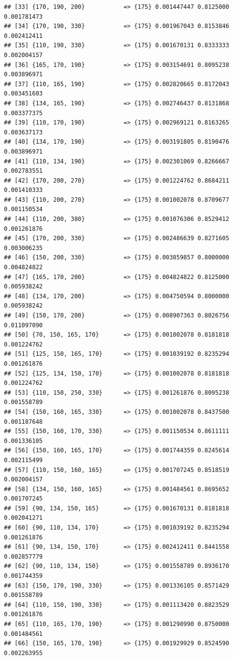 \documentclass[
]{article}
\begin{document}
\begin{verbatim}
## [33] {170, 190, 200}           => {175} 0.001447447 0.8125000  0.001781473
## [34] {170, 190, 330}           => {175} 0.001967043 0.8153846  0.002412411
## [35] {110, 190, 330}           => {175} 0.001670131 0.8333333  0.002004157
## [36] {165, 170, 190}           => {175} 0.003154691 0.8095238  0.003896971
## [37] {110, 165, 190}           => {175} 0.002820665 0.8172043  0.003451603
## [38] {134, 165, 190}           => {175} 0.002746437 0.8131868  0.003377375
## [39] {110, 170, 190}           => {175} 0.002969121 0.8163265  0.003637173
## [40] {134, 170, 190}           => {175} 0.003191805 0.8190476  0.003896971
## [41] {110, 134, 190}           => {175} 0.002301069 0.8266667  0.002783551
## [42] {170, 200, 270}           => {175} 0.001224762 0.8684211  0.001410333
## [43] {110, 200, 270}           => {175} 0.001002078 0.8709677  0.001150534
## [44] {110, 200, 380}           => {175} 0.001076306 0.8529412  0.001261876
## [45] {170, 200, 330}           => {175} 0.002486639 0.8271605  0.003006235
## [46] {150, 200, 330}           => {175} 0.003859857 0.8000000  0.004824822
## [47] {165, 170, 200}           => {175} 0.004824822 0.8125000  0.005938242
## [48] {134, 170, 200}           => {175} 0.004750594 0.8000000  0.005938242
## [49] {150, 170, 200}           => {175} 0.008907363 0.8026756  0.011097090
## [50] {70, 150, 165, 170}       => {175} 0.001002078 0.8181818  0.001224762
## [51] {125, 150, 165, 170}      => {175} 0.001039192 0.8235294  0.001261876
## [52] {125, 134, 150, 170}      => {175} 0.001002078 0.8181818  0.001224762
## [53] {110, 150, 250, 330}      => {175} 0.001261876 0.8095238  0.001558789
## [54] {150, 160, 165, 330}      => {175} 0.001002078 0.8437500  0.001187648
## [55] {150, 160, 170, 330}      => {175} 0.001150534 0.8611111  0.001336105
## [56] {150, 160, 165, 170}      => {175} 0.001744359 0.8245614  0.002115499
## [57] {110, 150, 160, 165}      => {175} 0.001707245 0.8518519  0.002004157
## [58] {134, 150, 160, 165}      => {175} 0.001484561 0.8695652  0.001707245
## [59] {90, 134, 150, 165}       => {175} 0.001670131 0.8181818  0.002041271
## [60] {90, 110, 134, 170}       => {175} 0.001039192 0.8235294  0.001261876
## [61] {90, 134, 150, 170}       => {175} 0.002412411 0.8441558  0.002857779
## [62] {90, 110, 134, 150}       => {175} 0.001558789 0.8936170  0.001744359
## [63] {150, 170, 190, 330}      => {175} 0.001336105 0.8571429  0.001558789
## [64] {110, 150, 190, 330}      => {175} 0.001113420 0.8823529  0.001261876
## [65] {110, 165, 170, 190}      => {175} 0.001298990 0.8750000  0.001484561
## [66] {150, 165, 170, 190}      => {175} 0.001929929 0.8524590  0.002263955

\end{verbatim}
\end{document}
